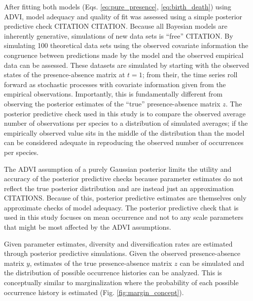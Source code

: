 \documentclass[12pt,letterpaper]{article}
\begin{document}
After fitting both models (Eqs. \ref{eq:pure_presence}, \ref{eq:birth_death}) using ADVI, model adequacy and quality of fit was assessed using a simple posterior predictive check CITATION CITATION. Because all Bayesian models are inherently generative, simulations of new data sets is ``free'' CITATION. By simulating 100 theoretical data sets using the observed covariate information the congruence between predictions made by the model and the observed empirical data can be assessed. These datasets are simulated by starting with the observed states of the presence-absence matrix at \(t = 1\); from their, the time series roll forward as stochastic processes with covariate information given from the empirical observations. Importantly, this is fundamentally different from observing the posterior estimates of the ``true'' presence-absence matrix \(z\). The posterior predictive check used in this study is to compare the observed average number of observations per species to a distribution of simulated averages; if the empirically observed value sits in the middle of the distribution than the model can be considered adequate in reproducing the observed number of occurrences per species. 

The ADVI assumption of a purely Gaussian posterior limits the utility and accuracy of the posterior predictive checks because parameter estimates do not reflect the true posterior distribution and are instead just an approximation CITATIONS. Because of this, posterior predictive estimates are themselves only approximate checks of model adequacy. The posterior predictive check that is used in this study focuses on mean occurrence and not to any scale parameters that might be most affected by the ADVI assumptions.


Given parameter estimates, diversity and diversification rates are estimated through posterior predictive simulations. Given the observed presence-absence matrix \(y\), estimates of the true presence-absence matrix \(z\) can be simulated and the distribution of possible occurrence histories can be analyzed. This is conceptually similar to marginalization where the probability of each possible occurrence history is estimated (Fig. \ref{fig:margin_concept}). 
\end{document}
